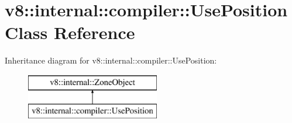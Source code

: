 \hypertarget{classv8_1_1internal_1_1compiler_1_1_use_position}{}\section{v8\+:\+:internal\+:\+:compiler\+:\+:Use\+Position Class Reference}
\label{classv8_1_1internal_1_1compiler_1_1_use_position}
Inheritance diagram for v8\+:\+:internal\+:\+:compiler\+:\+:Use\+Position\+:\begin{figure}[H]
\begin{center}
\leavevmode
\includegraphics[height=2.000000cm]{classv8_1_1internal_1_1compiler_1_1_use_position}
\end{center}
\end{figure}
